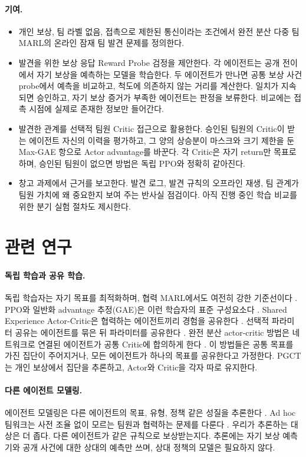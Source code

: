 \documentclass[10pt,twocolumn,letterpaper]{article}
\begin{document}
\paragraph{기여.}
\begin{itemize}\setlength\itemsep{1pt}
\item 개인 보상, 팀 라벨 없음, 접촉으로 제한된 통신이라는 조건에서 완전 분산 다중 팀 MARL의 온라인 잠재 팀 발견 문제를 정의한다.
\item 발견을 위한 보상 응답 Reward Probe 검정을 제안한다. 각 에이전트는 공개 전이에서 자기 보상을 예측하는 모델을 학습한다. 두 에이전트가 만나면 공통 보상 사건 probe에서 예측을 비교하고, 척도에 의존하지 않는 거리를 계산한다. 일치가 지속되면 승인하고, 자기 보상 증거가 부족한 에이전트는 판정을 보류한다. 비교에는 접촉 시점에 실제로 존재한 정보만 들어간다.
\item 발견한 관계를 선택적 팀원 Critic 접근으로 활용한다. 승인된 팀원의 Critic이 받는 에이전트 자신의 이력을 평가하고, 그 양의 상승분이 마스크와 크기 제한을 둔 Max-GAE 항으로 Actor advantage를 바꾼다. 각 Critic은 자기 return만 목표로 하며, 승인된 팀원이 없으면 방법은 독립 PPO와 정확히 같아진다.
\item 창고 과제에서 근거를 보고한다. 발견 로그, 발견 규칙의 오프라인 재생, 팀 관계가 팀원 가치에 왜 중요한지 보여 주는 반사실 점검이다. 아직 진행 중인 학습 비교를 위한 분기 실험 절차도 제시한다.
\end{itemize}

\section{관련 연구}
\paragraph{독립 학습과 공유 학습.}
독립 학습자는 자기 목표를 최적화하며, 협력 MARL에서도 여전히 강한 기준선이다 \citep{tan,ippo,benchmark}. PPO와 일반화 advantage 추정(GAE)은 이런 학습자의 표준 구성요소다 \citep{ppo,gae,mappo}. Shared Experience Actor-Critic은 협력하는 에이전트끼리 경험을 공유한다 \citep{seac}. 선택적 파라미터 공유는 에이전트를 묶은 뒤 파라미터를 공유한다 \citep{seps}. 완전 분산 actor-critic 방법은 네트워크로 연결된 에이전트가 공통 Critic에 합의하게 한다 \citep{fdmarl}. 이 방법들은 공통 목표를 가진 집단이 주어지거나, 모든 에이전트가 하나의 목표를 공유한다고 가정한다. PGCT는 개인 보상에서 집단을 추론하고, Actor와 Critic을 각자 따로 유지한다.

\paragraph{다른 에이전트 모델링.}
에이전트 모델링은 다른 에이전트의 목표, 유형, 정책 같은 성질을 추론한다 \citep{modelling}. Ad hoc 팀워크는 사전 조율 없이 모르는 팀원과 협력하는 문제를 다룬다 \citep{adhoc}. 우리가 추론하는 대상은 더 좁다. 다른 에이전트가 같은 규칙으로 보상받는지다. 추론에는 자기 보상 예측기와 공개 사건에 대한 상대의 예측만 쓰며, 상대 정책의 모델은 필요하지 않다.
\end{document}
